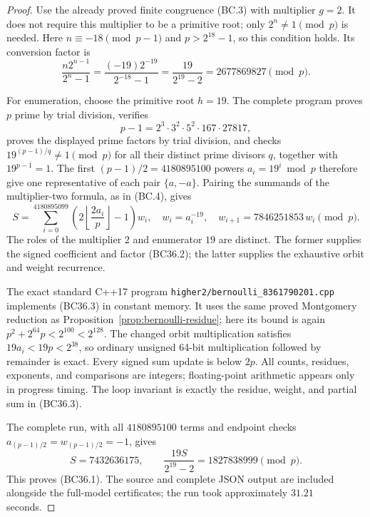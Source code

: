 \documentclass[11pt,a4paper]{article}
\theoremstyle{definition}
\begin{document}
\begin{proof}
Use the already proved finite congruence (BC.3) with multiplier $g=2$.
It does not require this multiplier to be a primitive root; only
$2^n\ne1\pmod p$ is needed.
Here $n\equiv-18\pmod{p-1}$ and $p>2^{18}-1$, so this condition
holds. Its conversion factor is
\[
 \frac{n2^{n-1}}{2^n-1}
 =\frac{(-19)2^{-19}}{2^{-18}-1}
 =\frac{19}{2^{19}-2}
 =2677869827\pmod p.
 \tag{BC36.2}
\]

For enumeration, choose the primitive root $h=19$.
The complete program proves $p$ prime by trial division, verifies
\[
 p-1=2^3\cdot3^2\cdot5^2\cdot167\cdot27817,
\]
proves the displayed prime factors by trial division, and checks
$19^{(p-1)/q}\ne1\pmod p$ for all their distinct prime divisors
$q$, together with $19^{p-1}=1$.
The first $(p-1)/2=4180895100$ powers $a_i=19^i\bmod p$
therefore give one representative of each pair $\{a,-a\}$.
Pairing the summands of the multiplier-two formula, as in (BC.4),
gives
\[
 S=\sum_{i=0}^{4180895099}
       \left(2\left\lfloor\frac{2a_i}{p}\right\rfloor-1\right)w_i,
 \quad
 w_i=a_i^{-19},\quad
 w_{i+1}=7846251853\,w_i\pmod p.
 \tag{BC36.3}
\]
The roles of the multiplier $2$ and enumerator $19$ are distinct.
The former supplies the signed coefficient and factor (BC36.2);
the latter supplies the exhaustive orbit and weight recurrence.

The exact standard C++17 program
\texttt{higher2/bernoulli\_8361790201.cpp}
implements (BC36.3) in constant memory.
It uses the same proved Montgomery reduction as
Proposition~\ref{prop:bernoulli-residue};
here its bound is again $p^2+2^{64}p<2^{100}<2^{128}$.
The changed orbit multiplication satisfies $19a_i<19p<2^{38}$,
so ordinary unsigned 64-bit multiplication followed by remainder
is exact. Every signed sum update is below $2p$.
All counts, residues, exponents, and comparisons are integers;
floating-point arithmetic appears only in progress timing.
The loop invariant is exactly the residue, weight, and partial sum
in (BC36.3).

The complete run, with all $4180895100$ terms and endpoint checks
$a_{(p-1)/2}=w_{(p-1)/2}=-1$, gives
\[
                     S=7432636175,\qquad
                     \frac{19S}{2^{19}-2}=1827838999\pmod p.
\]
This proves (BC36.1). The source and complete JSON output are included
alongside the full-model certificates; the run took approximately
$31.21$ seconds.


\end{proof}
\end{document}
